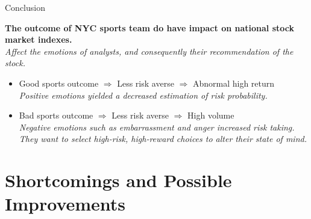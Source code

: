 \documentclass[]{beamer}
\begin{document}
\begin{frame}
        \begin{block}{\small{Conclusion}}
                \scriptsize
                    \item \textbf{The outcome of NYC sports team do have impact on national stock market indexes.}\\ \vskip 0.07cm
                    \tiny\textit{{Affect the emotions of analysts, and consequently their recommendation of the stock.}}
                     \begin{itemize}
                         \item \scriptsize{Good sports outcome $\Rightarrow$ Less risk averse $\Rightarrow$ Abnormal high return}\\\vskip 0.07cm
                         \tiny\textit{{Positive emotions yielded a decreased estimation of risk probability. \citep{p3}}}\\
                         \item \scriptsize{Bad sports outcome $\Rightarrow$ Less risk averse $\Rightarrow$ High volume}\\\vskip 0.07cm
                         \tiny\textit{{Negative emotions such as embarrassment and anger increased risk taking. They want to select high-risk, high-reward choices to alter their state of mind. \citep{p4}}}
                         
                     \end{itemize}
        \end{block}
        
\end{frame}

\section{Shortcomings and Possible Improvements}
\end{document}
